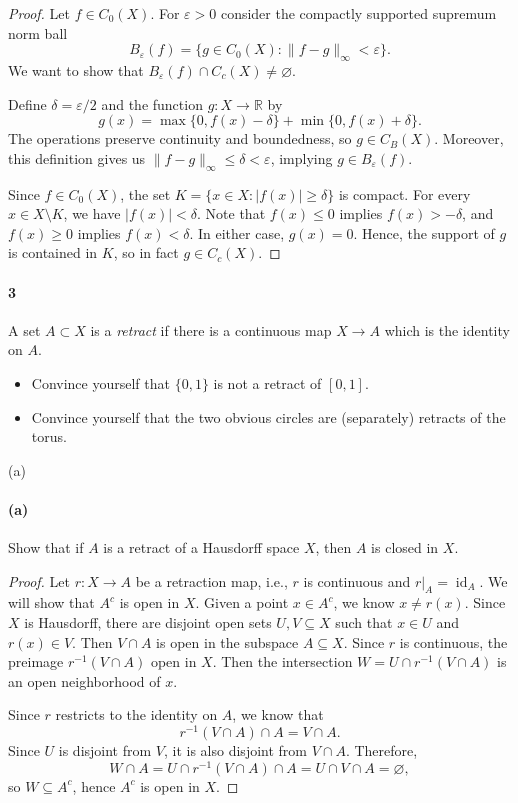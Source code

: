 \documentclass[12pt]{article}
\newlength{\myparskip}
\newenvironment{fullbox}{\begin{lrbox}{\savefullbox}\begin{minipage}{\dimexpr\textwidth-2\fboxsep\relax}\setlength{\parskip}{\myparskip}}{\end{minipage}\end{lrbox}\framebox[\textwidth]{\usebox{\savefullbox}}}
\newenvironment{pbox}[1][]{\begin{fullbox}\ifx#1\empty\else\paragraph{#1}\fi}{\end{fullbox}}
\theoremstyle{definition}
\newcommand{\R}{\mathbb{R}}
\newcommand{\eps}{\varepsilon}
\renewcommand{\emptyset}{\varnothing}
\newcommand{\<}{\langle}
\renewcommand{\>}{\rangle}
\DeclareMathOperator{\id}{id}
\begin{document}
\begin{proof}
    Let $f \in C_0(X)$. For $\eps > 0$ consider the compactly supported supremum norm ball
    \[
        B_\eps(f) = \{g \in C_0(X) : \|f - g\|_\infty < \eps\}.
    \]
    We want to show that $B_\eps(f) \cap C_c(X) \ne \emptyset$.

    Define $\delta = \eps/2$ and the function $g : X \to \R$ by
    \[
        g(x) = \max\{0, f(x) - \delta\} + \min\{0, f(x) + \delta\}.
    \]
    The operations preserve continuity and boundedness, so $g \in C_B(X)$.
    Moreover, this definition gives us $\|f - g\|_\infty \leq \delta < \eps$, implying $g \in B_\eps(f)$.

    Since $f \in C_0(X)$, the set $K = \{x \in X : |f(x)| \geq \delta\}$ is compact.
    For every $x \in X \setminus K$, we have $|f(x)| < \delta$.
    Note that $f(x) \leq 0$ implies $f(x) > -\delta$, and $f(x) \geq 0$ implies $f(x) < \delta$.
    In either case, $g(x) = 0$.
    Hence, the support of $g$ is contained in $K$, so in fact $g \in C_c(X)$.
\end{proof}


\newpage
\begin{pbox}[3]
    A set $A \subset X$ is a \emph{retract} if there is a continuous map
    $X \to A$ which is the identity on $A$.
    \begin{itemize}
    \item Convince yourself that $\{0,1\}$ is not a retract of $[0,1]$.
    \item Convince yourself that the two obvious circles are (separately) retracts
      of the torus.
    \end{itemize}
\end{pbox}

\begin{pbox}[(a)]
    Show that if $A$ is a retract of a Hausdorff space $X$, then $A$ is
    closed in $X$.
\end{pbox}

\begin{proof}
    Let $r : X \to A$ be a retraction map, i.e., $r$ is continuous and $r|_A = \id_A$.
    We will show that $A^c$ is open in $X$. Given a point $x \in A^c$, we know $x \ne r(x)$.
    Since $X$ is Hausdorff, there are disjoint open sets $U, V \subseteq X$ such that $x \in U$ and $r(x) \in V$. 
    Then $V \cap A$ is open in the subspace $A \subseteq X$.
    Since $r$ is continuous, the preimage $r^{-1}(V \cap A)$ open in $X$.
    Then the intersection $W = U \cap r^{-1}(V \cap A)$ is an open neighborhood of $x$.

    Since $r$ restricts to the identity on $A$, we know that
    \[
        r^{-1}(V \cap A) \cap A = V \cap A.
    \]
    Since $U$ is disjoint from $V$, it is also disjoint from $V \cap A$. Therefore,
    \[
        W \cap A
            = U \cap r^{-1}(V \cap A) \cap A
            = U \cap V \cap A
            = \emptyset,
    \]
    so $W \subseteq A^c$, hence $A^c$ is open in $X$.
\end{proof}
\end{document}
